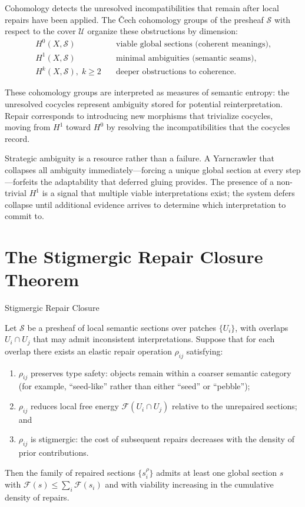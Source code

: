 Cohomology detects the unresolved incompatibilities that remain after local
repairs have been applied. The Čech cohomology groups of the presheaf
$\mathcal{S}$ with respect to the cover $\mathcal{U}$ organize these
obstructions by dimension:
\begin{align*}
  H^0(X, \mathcal{S}) &\quad \text{viable global sections (coherent meanings)}, \\
  H^1(X, \mathcal{S}) &\quad \text{minimal ambiguities (semantic seams)}, \\
  H^k(X, \mathcal{S}),\; k \geq 2 &\quad \text{deeper obstructions to coherence.}
\end{align*}

These cohomology groups are interpreted as measures of semantic entropy: the
unresolved cocycles represent ambiguity stored for potential reinterpretation. Repair
corresponds to introducing new morphisms that trivialize cocycles, moving from
$H^1$ toward $H^0$ by resolving the incompatibilities that the cocycles record.

\begin{remark}
Strategic ambiguity is a resource rather than a failure. A Yarncrawler that
collapses all ambiguity immediately---forcing a unique global section at every
step---forfeits the adaptability that deferred gluing provides. The presence of
a non-trivial $H^1$ is a signal that multiple viable interpretations exist; the
system defers collapse until additional evidence arrives to determine which
interpretation to commit to.
\end{remark}

\section{The Stigmergic Repair Closure Theorem}

\begin{theorem}{Stigmergic Repair Closure}
\label{thm:stigmergic}

Let $\mathcal{S}$ be a presheaf of local semantic sections over patches
$\{U_i\}$, with overlaps $U_i \cap U_j$ that may admit inconsistent
interpretations. Suppose that for each overlap there exists an elastic repair
operation $\rho_{ij}$ satisfying:
\begin{enumerate}
  \item $\rho_{ij}$ preserves type safety: objects remain within a coarser
        semantic category (for example, ``seed-like'' rather than either
        ``seed'' or ``pebble'');
  \item $\rho_{ij}$ reduces local free energy $\mathcal{F}(U_i \cap U_j)$
        relative to the unrepaired sections; and
  \item $\rho_{ij}$ is stigmergic: the cost of subsequent repairs decreases
        with the density of prior contributions.
\end{enumerate}
Then the family of repaired sections $\{s^{\rho}_i\}$ admits at least one global
section $s$ with $\mathcal{F}(s) \leq \sum_i \mathcal{F}(s_i)$ and with viability
increasing in the cumulative density of repairs.
\end{theorem}


